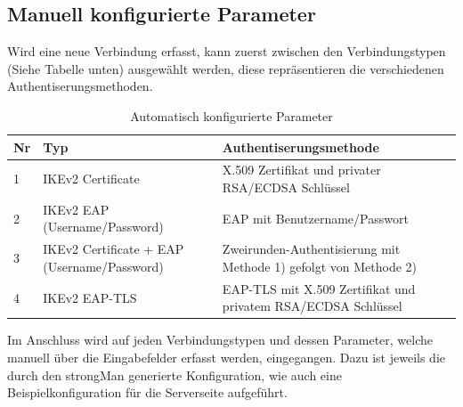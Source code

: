 \subsection{Manuell konfigurierte Parameter}
Wird eine neue Verbindung erfasst, kann zuerst zwischen den Verbindungstypen (Siehe Tabelle unten) ausgewählt werden, diese repräsentieren die verschiedenen Authentiserungsmethoden.\\

\begin{table}[H]
\centering
    \begin{tabular}{|p{}|p{}|p{}|}
    \hline
    \rowcolor{lightblue}
    Nr & Typ & Authentiserungsmethode \\ \hline
    1 & IKEv2 Certificate & X.509 Zertifikat und privater RSA/ECDSA Schlüssel\\ \hline
    2 & IKEv2 EAP (Username/Password) & EAP mit Benutzername/Passwort\\ \hline
    3 &  IKEv2 Certificate + EAP (Username/Password) & Zweirunden-Authentisierung mit Methode 1) gefolgt von Methode 2) \\ \hline
    4 & IKEv2 EAP-TLS & EAP-TLS mit X.509 Zertifikat und privatem RSA/ECDSA Schlüssel \\ \hline
	\end{tabular}
    \caption[Automatisch konfigurierte Parameter]{Automatisch konfigurierte Parameter}
\end{table}
\medskip
Im Anschluss wird auf jeden Verbindungstypen und dessen Parameter, welche manuell über die Eingabefelder erfasst werden, eingegangen. Dazu ist jeweils die durch den strongMan generierte Konfiguration, wie auch eine Beispielkonfiguration für die Serverseite aufgeführt. \\
\newpage
